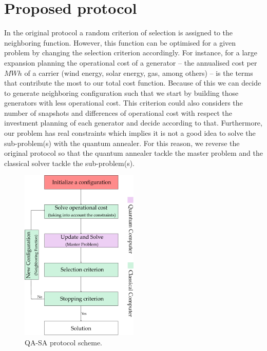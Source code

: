 \section{Proposed protocol}
In the original protocol a random criterion of selection is assigned to the neighboring function. However, this function can be optimised for a given problem by changing the selection criterion accordingly. For instance, for a large expansion planning the operational cost of a generator -- the annualised cost per $MWh$ of a carrier (wind energy, solar energy, gas, among others) --  is the terms that contribute the most to our total cost function. Because of this we can decide to generate neighboring configuration such that we start by building those generators with less operational cost. This criterion could also considers the number of snapshots and differences of operational cost with respect the investment planning of each generator and decide according to that. Furthermore, our problem has real constraints which implies it is not a good idea to solve the sub-problem(s) with the quantum annealer. For this reason, we reverse the original protocol so that the quantum annealer tackle the master problem and the classical solver tackle the sub-problem(s).
\begin{figure}[H]
\centering
\includegraphics[width=0.5\textwidth]{Figures/QASAProtocol_Layer 1.pdf} 
\caption{QA-SA protocol scheme.}
\label{fig:QA_SAProtocol}
\end{figure}
